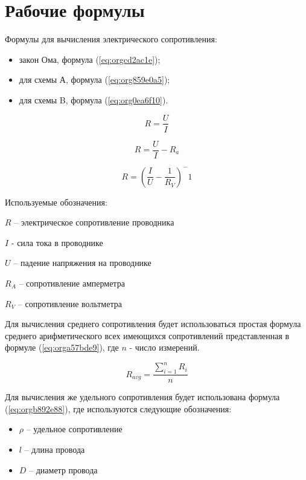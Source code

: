 \documentclass[14pt]{extarticle}
\begin{document}
\section{Рабочие формулы}
\label{sec:org6d54656}

Формулы для вычисления электрического сопротивления:

\begin{itemize}
\item закон Ома, формула (\ref{eq:orgcd2ac1e});
\item для схемы А, формула (\ref{eq:org859e0a5});
\item для схемы B, формула (\ref{eq:org0ea6f10}).
\end{itemize}

\begin{equation}
\label{eq:orgcd2ac1e}
R = \frac{U}{I}
\end{equation}

\begin{equation}
\label{eq:org859e0a5}
R = \frac{U}{I} - R_a
\end{equation}

\begin{equation}
\label{eq:org0ea6f10}
R = (\frac{I}{U} - \frac{1}{R_V})^-1
\end{equation}

Используемые обозначения:

\(R\) -- электрическое сопротивление проводника

\(I\) - сила тока в проводнике

\(U\) -- падение напряжения на проводнике

\(R_A\) -- сопротивление амперметра 

\(R_V\) -- сопротивление вольтметра

Для вычисления среднего сопротивления будет использоваться простая
формула среднего арифметического всех имеющихся сопротивлений
представленная в формуле (\ref{eq:orga57bde9}), где \(n\) - число измерений.


\begin{equation}
\label{eq:orga57bde9}
R_{avg} = \frac{\sum\limits_{i = 1}^{n} R_i}{n}
\end{equation}

Для вычисления же удельного сопротивления будет использована формула (\ref{eq:orgb892e88}),
где используются следующие обозначения:

\begin{itemize}
\item \(\rho\) -- удельное сопротивление
\item \(l\) -- длина провода
\item \(D\) -- диаметр провода
\end{itemize}
\end{document}
